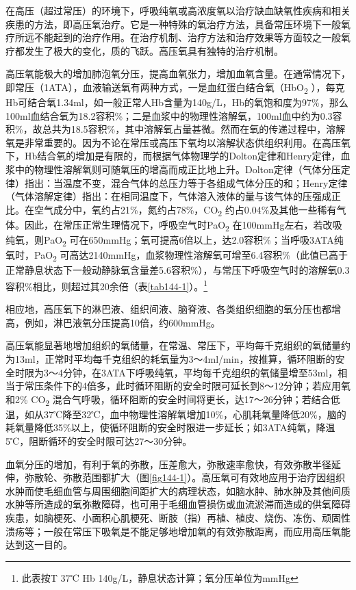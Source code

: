 在高压（超过常压）的环境下，呼吸纯氧或高浓度氧以治疗缺血缺氧性疾病和相关疾患的方法，即高压氧治疗。它是一种特殊的氧治疗方法，具备常压环境下一般氧疗所远不能起到的治疗作用。在治疗机制、治疗方法和治疗效果等方面较之一般氧疗都发生了极大的变化，质的飞跃。高压氧具有独特的治疗机制。

高压氧能极大的增加肺泡氧分压，提高血氧张力，增加血氧含量。在通常情况下，即常压（1ATA），血液输送氧有两种方式，一是血红蛋白结合氧（HbO\textsubscript{2}
），每克Hb可结合氧1.34ml，如一般正常人Hb含量为140g/L，Hb的氧饱和度为97\%，那么100ml血结合氧为18.2容积\%；二是血浆中的物理性溶解氧，100ml血中约为0.3容积\%，故总共为18.5容积\%，其中溶解氧占量甚微。然而在氧的传递过程中，溶解氧是非常重要的。因为不论在常压或高压下氧均以溶解状态供组织利用。在高压氧下，Hb结合氧的增加是有限的，而根据气体物理学的Dolton定律和Henry定律，血浆中的物理性溶解氧则可随氧压的增高而成正比地上升。Dolton定律（气体分压定律）指出：当温度不变，混合气体的总压力等于各组成气体分压的和；Henry定律（气体溶解定律）指出：在相同温度下，气体溶入液体的量与该气体的压强成正比。在空气成分中，氧约占21\%，氮约占78\%，CO\textsubscript{2}
约占0.04\%及其他一些稀有气体。因此，在常压正常生理情况下，呼吸空气时PaO\textsubscript{2}
在100mmHg左右，若改吸纯氧，则PaO\textsubscript{2}
可在650mmHg；氧可提高6倍以上，达2.0容积\%；当呼吸3ATA纯氧时，PaO\textsubscript{2}
可高达2140mmHg，血浆物理性溶解氧可增至6.4容积\%（此值已高于正常静息状态下一般动静脉氧含量差5.6容积\%），与常压下呼吸空气时的溶解氧0.3容积\%相比，则超过其20余倍（表\ref{tab144-1}）。\footnote{此表按T 37℃ Hb 140g/L，静息状态计算；氧分压单位为mmHg}

相应地，高压氧下的淋巴液、组织间液、脑脊液、各类组织细胞的氧分压也都增高，例如，淋巴液氧分压提高10倍，约600mmHg。

高压氧能显著地增加组织的氧储量，在常温、常压下，平均每千克组织的氧储量约为13ml，正常时平均每千克组织的耗氧量为3～4ml/min，按推算，循环阻断的安全时限为3～4分钟，在3ATA下呼吸纯氧，平均每千克组织的氧储量增至53ml，相当于常压条件下的4倍多，此时循环阻断的安全时限可延长到8～12分钟；若应用氧和2\%
CO\textsubscript{2}
混合气呼吸，循环阻断的安全时间将更长，达17～26分钟；若结合低温，如从37℃降至32℃，血中物理性溶解氧增加10\%，心肌耗氧量降低20\%，脑的耗氧量降低35\%以上，使循环阻断的安全时限进一步延长；如3ATA纯氧，降温5℃，阻断循环的安全时限可达27～30分钟。

血氧分压的增加，有利于氧的弥散，压差愈大，弥散速率愈快，有效弥散半径延伸，弥散轮、弥散范围都扩大（图\ref{fig144-1}）。高压氧可有效地应用于治疗因组织水肿而使毛细血管与周围细胞间距扩大的病理状态，如脑水肿、肺水肿及其他间质水肿等所造成的氧弥散障碍，也可用于毛细血管损伤或血流淤滞而造成的供氧障碍疾患，如脑梗死、小面积心肌梗死、断肢（指）再植、植皮、烧伤、冻伤、顽固性溃疡等；一般在常压下吸氧是不能足够地增加氧的有效弥散距离，而应用高压氧能达到这一目的。

